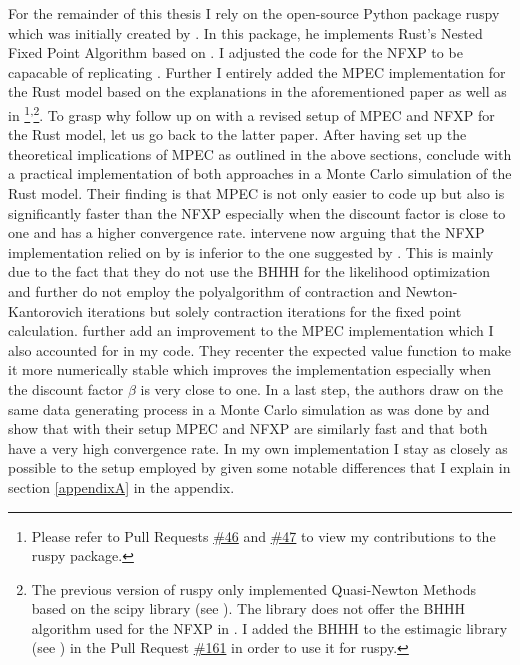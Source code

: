 For the remainder of this thesis I rely on the open-source Python package ruspy which was initially created by \cite{Blesch.2019}. In this package, he implements Rust's Nested Fixed Point Algorithm based on \cite{Rust.2000}. I adjusted the code for the NFXP to be capacable of replicating \cite{Iskhakov.2016}. Further I entirely added the MPEC implementation for the Rust model based on the explanations in the aforementioned paper as well as in \cite{Su.Judd.2012} \footnote{Please refer to Pull Requests \href{https://github.com/OpenSourceEconomics/ruspy/pull/46}{\#46} and \href{https://github.com/OpenSourceEconomics/ruspy/pull/47}{\#47} to view my contributions to the ruspy package.}\textsuperscript{,}\footnote{The previous version of ruspy only implemented Quasi-Newton Methods based on the scipy library (see \cite{scipy.2020}). The library does not offer the BHHH algorithm used for the NFXP in \cite{Iskhakov.2016}. I added the BHHH to the estimagic library (see \cite{Gabler.2019}) in the Pull Request \href{https://github.com/OpenSourceEconomics/estimagic/pull/161}{\#161} in order to use it for ruspy.}. To grasp why \citeauthor{Iskhakov.2016} follow up on \citeauthor{Su.Judd.2012} with a revised setup of MPEC and NFXP for the Rust model, let us go back to the latter paper. After having set up the theoretical implications of MPEC as outlined in the above sections, \citeauthor{Su.Judd.2012} conclude with a practical implementation of both approaches in a Monte Carlo simulation of the Rust model. Their finding is that MPEC is not only easier to code up but also is significantly faster than the NFXP especially when the discount factor is close to one and has a higher convergence rate. \citeauthor{Iskhakov.2016} intervene now arguing that the NFXP implementation relied on by \citeauthor{Su.Judd.2012} is inferior to the one suggested by \cite{Rust.2000}. This is mainly due to the fact that they do not use the BHHH for the likelihood optimization and further do not employ the polyalgorithm of contraction and Newton-Kantorovich iterations but solely contraction iterations for the fixed point calculation. \citeauthor{Iskhakov.2016} further add an improvement to the MPEC implementation which I also accounted for in my code. They recenter the expected value function to make it more numerically stable which improves the implementation especially when the discount factor $\beta$ is very close to one. In a last step, the authors draw on the same data generating process in a Monte Carlo simulation as was done by \citeauthor{Su.Judd.2012} and show that with their setup MPEC and NFXP are similarly fast and that both have a very high convergence rate. In my own implementation I stay as closely as possible to the setup employed by \citeauthor{Iskhakov.2016} given some notable differences that I explain in section \ref{appendixA} in the appendix.

